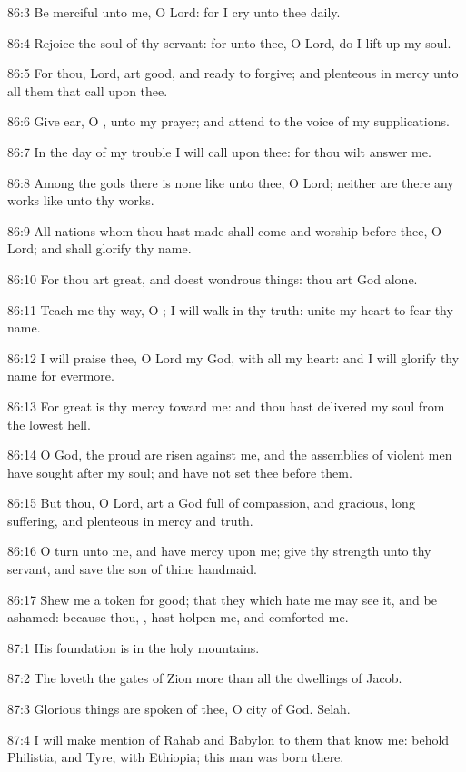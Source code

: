 86:3 Be merciful unto me, O Lord: for I cry unto thee daily.

86:4 Rejoice the soul of thy servant: for unto thee, O Lord, do I lift up my soul.

86:5 For thou, Lord, art good, and ready to forgive; and plenteous in mercy unto all them that call upon thee.

86:6 Give ear, O \LORD, unto my prayer; and attend to the voice of my supplications.

86:7 In the day of my trouble I will call upon thee: for thou wilt answer me.

86:8 Among the gods there is none like unto thee, O Lord; neither are there any works like unto thy works.

86:9 All nations whom thou hast made shall come and worship before thee, O Lord; and shall glorify thy name.

86:10 For thou art great, and doest wondrous things: thou art God alone.

86:11 Teach me thy way, O \LORD; I will walk in thy truth: unite my heart to fear thy name.

86:12 I will praise thee, O Lord my God, with all my heart: and I will glorify thy name for evermore.

86:13 For great is thy mercy toward me: and thou hast delivered my soul from the lowest hell.

86:14 O God, the proud are risen against me, and the assemblies of violent men have sought after my soul; and have not set thee before them.

86:15 But thou, O Lord, art a God full of compassion, and gracious, long suffering, and plenteous in mercy and truth.

86:16 O turn unto me, and have mercy upon me; give thy strength unto thy servant, and save the son of thine handmaid.

86:17 Shew me a token for good; that they which hate me may see it, and be ashamed: because thou, \LORD, hast holpen me, and comforted me.



87:1 His foundation is in the holy mountains.

87:2 The \LORD loveth the gates of Zion more than all the dwellings of Jacob.

87:3 Glorious things are spoken of thee, O city of God. Selah.

87:4 I will make mention of Rahab and Babylon to them that know me: behold Philistia, and Tyre, with Ethiopia; this man was born there.

